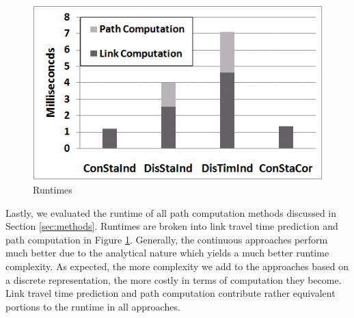 \begin{figure}
    \centering
    \includegraphics[width = 0.75\columnwidth]{figures/Runtime.png}
    \caption{Runtimes}\label{fig:runtimes}
\end{figure}

Lastly, we evaluated the runtime of all path computation methods discussed in Section \ref{sec:methods}. Runtimes are broken into link travel time prediction and path computation in Figure \ref{fig:runtimes}. Generally, the continuous approaches perform much better due to the analytical nature which yields a much better runtime complexity. As expected, the more complexity we add to the approaches based on a discrete representation, the more costly in terms of computation they become. Link travel time prediction and path computation contribute rather equivalent portions to the runtime in all approaches.